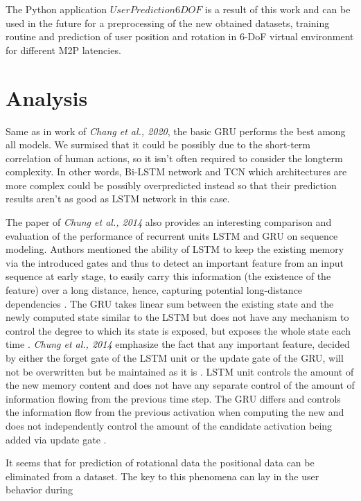 The Python application $UserPrediction6DOF$ is a result of this work and can be used in the future for a preprocessing of the new obtained datasets, training routine and prediction of user position and rotation in 6-DoF virtual environment for different M2P latencies. 

\section{Analysis}
\label{sec:conclusion:analysis}
Same as in work of \textit{Chang et al., 2020}, the basic GRU performs the best among all models. We surmised that it could be possibly due to the short-term correlation of human actions, so it isn’t often required to consider the longterm complexity. In other words, Bi-LSTM network and TCN which architectures are more complex could be possibly overpredicted instead so that their prediction results aren’t as good as LSTM network in this case.

The paper of \textit{Chung et al., 2014}  also provides an interesting comparison and evaluation of the performance of recurrent units LSTM and GRU on sequence modeling. Authors mentioned the ability of LSTM to keep the existing memory via the introduced gates and thus to detect an important feature from an input sequence at early stage, to easily carry this information (the existence of the feature) over a long distance, hence, capturing potential long-distance dependencies \cite{empirical_evaluation}. The GRU takes linear sum between the existing state and the newly computed state similar to the LSTM but does not have any mechanism to control the degree to which its state is exposed, but exposes the whole state each time \cite{empirical_evaluation}. \textit{Chung et al., 2014} emphasize the fact that any important feature, decided by either the forget gate of the LSTM unit or the update gate of the GRU, will not be overwritten but be maintained as it is \cite{empirical_evaluation}. LSTM unit controls the amount of the new memory content and does not have any separate control of the amount of information flowing from the previous time step. The GRU differs and controls the information flow from the previous activation when computing the new and does not independently control the amount of the candidate activation being added via update gate \cite{empirical_evaluation}.


It seems that for  prediction of rotational data the positional data can be eliminated from a dataset. The key to this phenomena can lay in the user behavior during 


